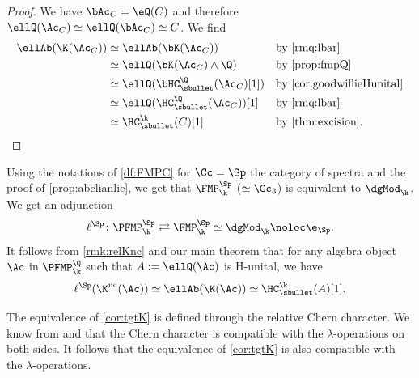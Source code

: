 \begin{proof}
We have $\bAc_C = \eQ(C)$ and therefore $\ellQ(\Ac_C) \simeq \ellQ(\bAc_C) \simeq C$.
We find
\begin{align*}
\ellAb(\K(\Ac_C)) &\simeq \ellAb(\bK(\Ac_C)) & &\text{by \autoref{rmq:lbar}}
\\ &\simeq \ellQ( \bK(\Ac_C) \wedge \Q) & &\text{by \autoref{prop:fmpQ}}
\\ &\simeq \ellQ(\bHC_\sbullet^\Q(\Ac_C)[1]) & &\text{by \autoref{cor:goodwillieHunital}}
\\ &\simeq \ellQ(\HC_\sbullet^\Q(\Ac_C))[1] & &\text{by \autoref{rmq:lbar}}
\\ &\simeq \HC_\sbullet^\k(C)[1] & &\text{by \autoref{thm:excision}}.\qedhere
\end{align*}
\end{proof}

\begin{rmq}\label{rmk:ellKnc}
Using the notations of \autoref{df:FMPC} for $\Cc = \Sp$ the category of spectra and the proof of \autoref{prop:abelianlie}, we get that $\FMP^\Sp_\k$ ($\simeq \Cc_3$) is equivalent to $\dgMod_\k$.
We get an adjunction
\[
\ell^\Sp \colon \PFMP_\k^\Sp \rightleftarrows \FMP_\k^\Sp \simeq \dgMod_\k \noloc \e_\Sp.
\]
It follows from \autoref{rmk:relKnc} and our main theorem that for any algebra object $\Ac$ in $\PFMP_\k^\Q$ such that $A := \ellQ(\Ac)$ is H-unital, we have
\[
\ell^\Sp (\K^\mathrm{nc}(\Ac)) \simeq \ellAb (\K(\Ac)) \simeq \HC^\k_\sbullet(A)[1].
\]
\end{rmq}

\begin{rmq}
The equivalence of \autoref{cor:tgtK} is defined through the relative Chern character. We know from \cite{cathelineau:lambda} and \cite{chw:lambda} that the Chern character is compatible with the $\lambda$-operations on both sides. It follows that the equivalence of \autoref{cor:tgtK} is also compatible with the $\lambda$-operations.
\end{rmq}

